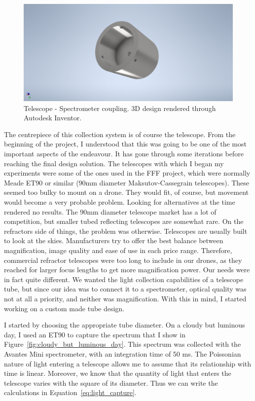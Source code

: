 \begin{figure}[htpb]
    \centering
    \includegraphics[width=\textwidth]{img/pdf/eyepieceAdapter.pdf}
    \caption{Telescope - Spectrometer coupling. 3D design rendered
    through Autodesk Inventor.}%
    \label{fig:spectrometer_telescope_coupling_3d}
\end{figure}

The centrepiece of this collection system is of course the telescope.
From the beginning of the project, I understood that this was going to
be one of the most important aspects of the endeavour. It has gone
through some iterations before reaching the final design solution. The
telescopes with which I began my experiments were some of the ones used
in the \gls{FFF} project, which were normally Meade ET90 or similar
(90mm diameter Maksutov-Cassegrain telescopes). These seemed too bulky
to mount on a drone. They would fit, of course, but movement would
become a very probable problem. Looking for alternatives at the time
rendered no results. The 90mm diameter telescope market has a lot of
competition, but smaller tubed reflecting telescopes are somewhat rare.
On the refractors side of things, the problem was otherwise. Telescopes
are usually built to look at the skies. Manufacturers try to offer the
best balance between magnification, image quality and ease of use in
each price range. Therefore, commercial refractor telescopes were too
long to include in our drones, as they reached for larger focus lengths
to get more magnification power. Our needs were in fact quite
different. We wanted the light collection capabilities of a telescope
tube, but since our idea was to connect it to a spectrometer, optical
quality was not at all a priority, and neither was magnification. With
this in mind, I started working on a custom made tube design.

I started by choosing the appropriate tube diameter. On a cloudy but
luminous day, I used an ET90 to capture the spectrum that I show in
Figure~\ref{fig:cloudy_but_luminous_day}. This spectrum was collected
with the Avantes Mini spectrometer, with an integration time of 50 ms.
The Poissonian nature of light entering a telescope allows me to assume
that its relationship with time is linear. Moreover, we know that the
quantity of light that enters the telescope varies with the square of
its diameter. Thus we can write the calculations in
Equation~\ref{eq:light_capture}.

